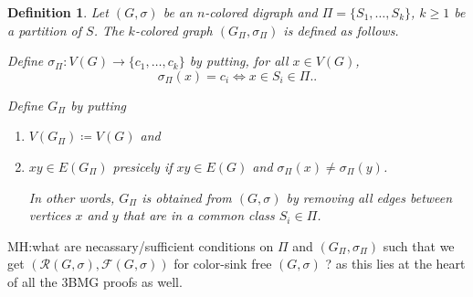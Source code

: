\documentclass[final,3p,times]{elsarticle}
\newtheorem{definition}{Definition}[section]
\newcommand{\TODO}[1]{\begingroup\color{red}#1\endgroup}
\begin{document}
%	


	
	
\begin{definition}
	Let $(G,\sigma)$ be an $n$-colored digraph and $\Pi = \{S_1,\dots,S_k\}$, $k\geq 1$
	be a partition of $S$. The $k$-colored graph $(G_{\Pi},\sigma_{\Pi})$ is defined as follows. 
	
	
	Define $\sigma_{\Pi}\colon V(G) \to \{c_1,\dots,c_k\}$ by putting, for all $x\in V(G)$, 
    \[\sigma_{\Pi}(x)=c_i \iff x\in S_i\in \Pi..\] 
    
    Define  $G_{\Pi}$ by putting
	\begin{enumerate}
    	\item $V(G_{\Pi}) \coloneqq V(G)$ and
    
    \item $xy\in E(G_{\Pi})$  presicely if $xy\in E(G)$ and 
    	  $\sigma_{\Pi}(x)\neq \sigma_{\Pi}(y)$. 
    	  
    	  In other words,  $G_{\Pi}$ 
    	  is obtained from $(G,\sigma)$ by removing all
    	  edges between vertices $x$ and $y$ that are 
    	  in a common class $S_i\in \Pi$. 
\end{enumerate}
\end{definition}	
	
	



\TODO{MH:what are necassary/sufficient conditions on $\Pi$ and $(G_{\Pi},\sigma_{\Pi})$
such that we get $(\mathscr{R}(G,\sigma),\mathscr{F}(G,\sigma))$ for color-sink free $(G,\sigma)$
? as this lies at the heart of all the 3BMG proofs as well. }



















\end{document}
